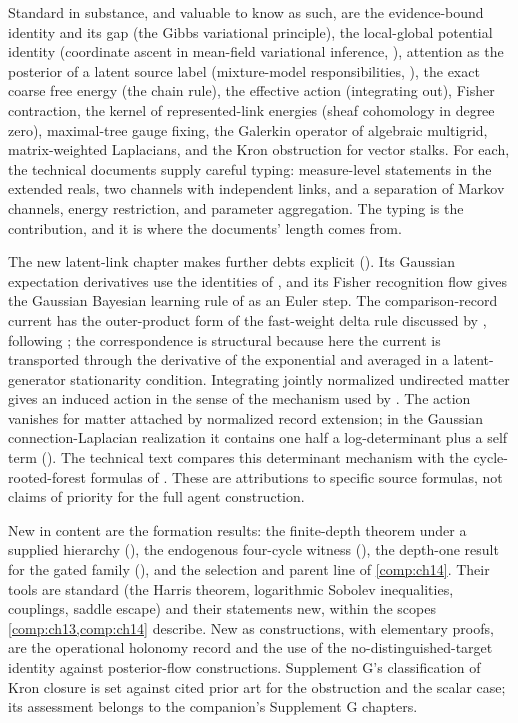 Standard in substance, and valuable to know as such, are the evidence-bound identity and its gap (the
Gibbs variational principle), the local-global potential identity (coordinate ascent in mean-field
variational inference, ), attention as the posterior of a latent
source label (mixture-model responsibilities, ), the exact coarse free energy
(the chain rule), the effective action (integrating out), Fisher contraction, the kernel of
represented-link energies (sheaf cohomology in degree zero), maximal-tree gauge fixing, the Galerkin
operator of algebraic multigrid, matrix-weighted Laplacians, and the Kron obstruction for vector stalks.
For each, the technical documents supply careful typing: measure-level statements in the extended reals,
two channels with independent links, and a separation of Markov channels, energy restriction, and
parameter aggregation. The typing is the contribution, and it is where the documents' length comes from.

The new latent-link chapter makes further debts explicit (). Its
Gaussian expectation derivatives use the identities of \citet{OpperArchambeau2009}, and its
Fisher recognition flow gives the Gaussian Bayesian learning rule of \citet{KhanRue2023} as an
Euler step. The comparison-record current has the outer-product form of the fast-weight delta
rule discussed by \citet{Schlag2021}, following \citet{Schmidhuber1992}; the correspondence is
structural because here the current is transported through the derivative of the exponential and
averaged in a latent-generator stationarity condition. Integrating jointly normalized undirected
matter gives an induced action in the sense of the mechanism used by \citet{KazakovMigdal1993}.
The action vanishes for matter attached by normalized record extension; in the Gaussian
connection-Laplacian realization it contains one half a log-determinant plus a self term
(). The technical text compares this determinant mechanism with the
cycle-rooted-forest formulas of \citet{Kenyon2011VectorBundleLaplacian}. These are attributions to
specific source formulas, not claims of priority for the full agent construction.

New in content are the formation results: the finite-depth theorem under a supplied hierarchy
(), the endogenous four-cycle witness
(), the depth-one result for the gated family
(), and the selection and parent line of \cref{comp:ch14}. Their tools are
standard (the Harris theorem, logarithmic Sobolev inequalities, couplings, saddle escape) and their
statements new, within the scopes \cref{comp:ch13,comp:ch14} describe. New as constructions, with
elementary proofs, are the operational holonomy record and the use of the no-distinguished-target identity
against posterior-flow constructions. Supplement G's classification of Kron closure is set against cited
prior art for the obstruction and the scalar case; its assessment belongs to the companion's Supplement G
chapters.

